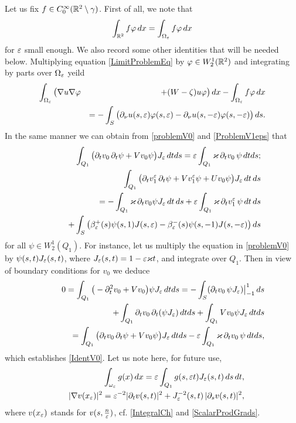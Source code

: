 Let us fix $f\in C_0^\infty(\mathbb R^2\setminus\gamma)$.
First of all, we note that
\begin{equation}\label{IntR2=IntOmEps}
  \int_{\mathbb R^2}f\varphi\,dx=\int_{\Omega_\varepsilon}f\varphi\,dx
\end{equation}
for $\varepsilon$ small enough.
We also record some other identities that will be needed below.
Multiplying equation \eqref{LimitProblemEq} by $\varphi\in W_2^1(\mathbb R^2)$ and integrating by parts over $\Omega_\varepsilon$ yeild
\begin{eqnarray}\nonumber
\int_{\Omega_\varepsilon}\big(\nabla u \nabla \varphi&&+(W-\zeta)u\varphi \big)\,dx-\int_{\Omega_\varepsilon}f\varphi\,dx\\\label{IdentU}
&&=-\int_S \big(\partial_\nu u(s,\varepsilon)\varphi(s,\varepsilon)-\partial_\nu u(s,-\varepsilon)\varphi(s,-\varepsilon) \big)\,ds.
\end{eqnarray}
In the same manner we can obtain from \eqref{problemV0} and \eqref{ProblemV1eps} that
\begin{eqnarray}\label{IdentV0}
&&\int_{Q_1}\big(\partial_t v_0 \,\partial_t \psi
+Vv_0 \psi\big)J_\varepsilon\,dt ds
=\varepsilon \int_{Q_1} \varkappa\,\partial_t v_0\, \psi \,dt ds;
\\\nonumber
&&\int_{Q_1}\big(\partial_t v_1^\varepsilon \,\partial_t \psi
+Vv_1^\varepsilon \psi+Uv_0\psi\big)J_\varepsilon\,dt\, ds
\\\label{IdentV1}
&&\kern20pt=
-\int_{Q_1}\varkappa \,\partial_t v_0\psi J_\varepsilon\,dt\, ds+\varepsilon\int_{Q_1}\varkappa \,\partial_t v_1^\varepsilon\, \psi\,dt\, ds\\\nonumber
&&\kern20pt+\int_S\left(\beta_\varepsilon^+(s)\psi(s,1)J(s,\varepsilon)
-\beta_\varepsilon^-(s)\psi(s,-1)J(s,-\varepsilon)\right)ds
\end{eqnarray}
for all $\psi\in W_2^1(Q_1)$.
For instance, let us multiply the equation in \eqref{problemV0} by $\psi(s,t)J_\varepsilon(s,t)$, where $J_\varepsilon(s,t)=1-\varepsilon\varkappa t$, and integrate over $Q_1$. Then in view of boundary conditions for $v_0$ we deduce
\begin{eqnarray}\nonumber
  &&0=\int_{Q_1}\big(-\partial_t^2 v_0+Vv_0\big) \psi J_\varepsilon\,dt ds=-\int_S (\partial_t v_0 \,\psi J_\varepsilon)\big|_{-1}^1\,ds\\\nonumber
&&\kern30pt+
\int_{Q_1}\partial_t v_0 \,\partial_t (\psi J_\varepsilon)\,dt ds
+\int_{Q_1}Vv_0 \psi J_\varepsilon\,dt ds\\\nonumber
&&\kern30pt=\int_{Q_1}\big(\partial_t v_0 \,\partial_t \psi
+Vv_0 \psi\big)J_\varepsilon\,dt ds
-\varepsilon \int_{Q_1} \varkappa\,\partial_t v_0\, \psi \,dt ds,
\end{eqnarray}
which establishes \eqref{IdentV0}.
Let us note here, for future use,
\begin{eqnarray}\label{IntXtoIntST}
&& \int_{\omega_\varepsilon} g(x)\,dx=\varepsilon \int_{Q_1} g(s,\varepsilon t)J_\varepsilon(s,t)\,ds\,dt,\\\label{LocalGrad}
&&
|\nabla v(x_\varepsilon)|^2=\varepsilon^{-2}|\partial_t v(s,t)|^2+J^{-2}_\varepsilon(s,t)\,|\partial_s v(s,t)|^2,
\end{eqnarray}
where $v(x_\varepsilon)$ stands for $v(s,\textstyle\frac n{\varepsilon})$, cf. \eqref{IntegralCh} and \eqref{ScalarProdGrads}.

